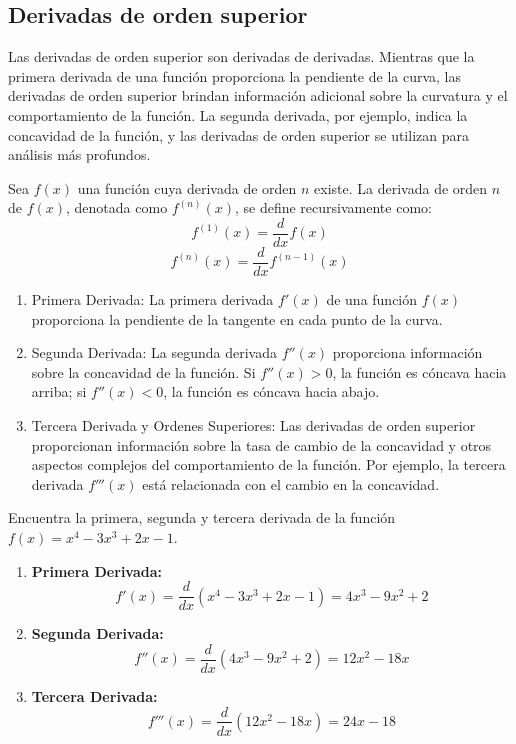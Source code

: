 \subsection{Derivadas de orden superior}

Las derivadas de orden superior son derivadas de derivadas. Mientras que la primera derivada de una función proporciona la pendiente de la curva, las derivadas de orden superior brindan información adicional sobre la curvatura y el comportamiento de la función. La segunda derivada, por ejemplo, indica la concavidad de la función, y las derivadas de orden superior se utilizan para análisis más profundos.

\begin{definition}
    Sea \( f(x) \) una función cuya derivada de orden \( n \) existe. La derivada de orden \( n \) de \( f(x) \), denotada como \( f^{(n)}(x) \), se define recursivamente como:
\begin{equation*}
    f^{(1)}(x) = \frac{d}{dx}f(x)
\end{equation*}
\begin{equation}
    f^{(n)}(x) = \frac{d}{dx} f^{(n-1)}(x)
\end{equation}

\end{definition}

\begin{enumerate}
    \item Primera Derivada:
    La primera derivada \( f'(x) \) de una función \( f(x) \) proporciona la pendiente de la tangente en cada punto de la curva.
    \item Segunda Derivada:
    La segunda derivada \( f''(x) \) proporciona información sobre la concavidad de la función. Si \( f''(x) > 0 \), la función es cóncava hacia arriba; si \( f''(x) < 0 \), la función es cóncava hacia abajo.    
    \item Tercera Derivada y Ordenes Superiores:
    Las derivadas de orden superior proporcionan información sobre la tasa de cambio de la concavidad y otros aspectos complejos del comportamiento de la función. Por ejemplo, la tercera derivada \( f'''(x) \) está relacionada con el cambio en la concavidad.
    
\end{enumerate}
\begin{example}
Encuentra la primera, segunda y tercera derivada de la función \( f(x) = x^4 - 3x^3 + 2x - 1 \).
\begin{enumerate}
    \item \textbf{Primera Derivada:}
    \[
    f'(x) = \frac{d}{dx}(x^4 - 3x^3 + 2x - 1) = 4x^3 - 9x^2 + 2
    \]
    
    \item \textbf{Segunda Derivada:}
    \[
    f''(x) = \frac{d}{dx}(4x^3 - 9x^2 + 2) = 12x^2 - 18x
    \]    
    \item \textbf{Tercera Derivada:}
    \[
    f'''(x) = \frac{d}{dx}(12x^2 - 18x) = 24x - 18
    \]
\end{enumerate}
\end{example}

